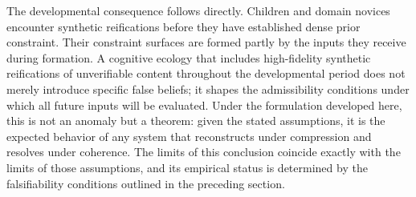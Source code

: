 \documentclass[12pt, a4paper]{article}
\begin{document}
The developmental consequence follows directly. Children and domain novices encounter synthetic reifications before they have established dense prior constraint. Their constraint surfaces are formed partly by the inputs they receive during formation. A cognitive ecology that includes high-fidelity synthetic reifications of unverifiable content throughout the developmental period does not merely introduce specific false beliefs; it shapes the admissibility conditions under which all future inputs will be evaluated. Under the formulation developed here, this is not an anomaly but a theorem: given the stated assumptions, it is the expected behavior of any system that reconstructs under compression and resolves under coherence. The limits of this conclusion coincide exactly with the limits of those assumptions, and its empirical status is determined by the falsifiability conditions outlined in the preceding section.
\end{document}
